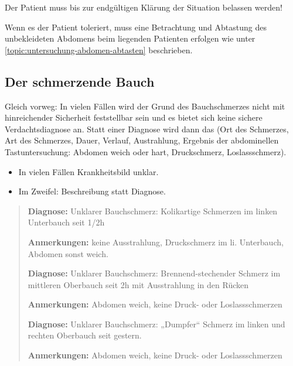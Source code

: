 Der Patient muss bis zur endgültigen Klärung der Situation
 belassen werden!

Wenn es der Patient toleriert, muss eine Betrachtung und
Abtastung des unbekleideten Abdomens beim liegenden
Patienten erfolgen wie unter
\ref{topic:untersuchung-abdomen-abtasten} beschrieben.

\subsection{Der schmerzende Bauch}

{%
Gleich vorweg: In vielen
Fällen wird der Grund des Bauchschmerzes nicht mit
hinreichender Sicherheit feststellbar sein und es bietet sich
keine sichere Verdachtsdiagnose an. Statt einer Diagnose wird
dann das  (Ort des Schmerzes, Art des
Schmerzes, Dauer, Verlauf, Austrahlung, Ergebnis der
abdominellen Tastuntersuchung: Abdomen weich oder hart,
Druckschmerz, Loslassschmerz).
}{
\begin{itemize}
  \item In vielen Fällen Krankheitsbild unklar.
  \item Im Zweifel: Beschreibung statt Diagnose.
\end{itemize}
}{}{}{}

{
\begin{quote}
{\sffamily\bfseries Diagnose:} {\ttfamily Unklarer
Bauchschmerz: Kolikartige Schmerzen im linken Unterbauch seit 1/2h }

{\sffamily\bfseries Anmerkungen:} {\ttfamily keine Ausstrahlung, Druckschmerz im li. Unterbauch, Abdomen sonst  weich.}
\vspace{0.5em}

{\sffamily\bfseries Diagnose:} {\ttfamily Unklarer
Bauchschmerz: Brennend-stechender Schmerz im mittleren
Oberbauch seit 2h mit Ausstrahlung in den Rücken}

{\sffamily\bfseries Anmerkungen:} {\ttfamily Abdomen weich,
keine Druck- oder Loslassschmerzen}
\vspace{0.5em}

{\sffamily\bfseries Diagnose:} {\ttfamily Unklarer
Bauchschmerz: „Dumpfer“ Schmerz im linken und rechten
Oberbauch seit gestern. }

{\sffamily\bfseries Anmerkungen:} {\ttfamily Abdomen
weich, keine Druck- oder Loslassschmerzen}
\end{quote}
}{

}{}{}{}



